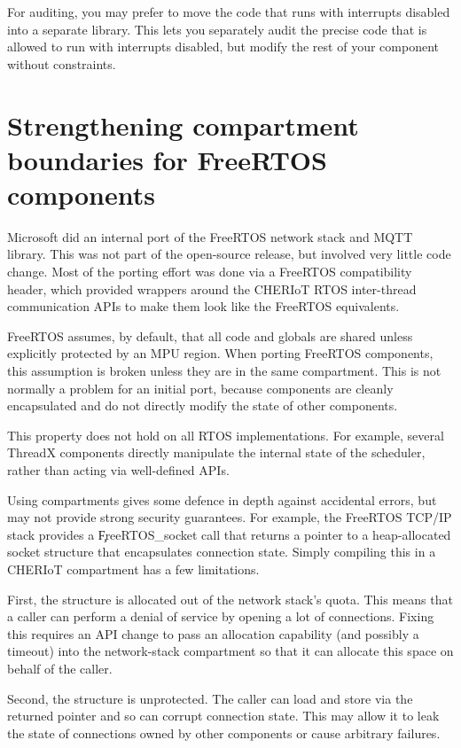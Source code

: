 For auditing, you may prefer to move the code that runs with interrupts disabled into a separate library.
This lets you separately audit the precise code that is allowed to run with interrupts disabled, but modify the rest of your component without constraints.

\section{Strengthening compartment boundaries for FreeRTOS components }

Microsoft did an internal port of the FreeRTOS network stack and MQTT library.
This was not part of the open-source release, but involved very little code change.
Most of the porting effort was done via a FreeRTOS compatibility header, which provided wrappers around the CHERIoT RTOS inter-thread communication APIs to make them look like the FreeRTOS equivalents.

FreeRTOS assumes, by default, that all code and globals are shared unless explicitly protected by an MPU region.
When porting FreeRTOS components, this assumption is broken unless they are in the same compartment.
This is not normally a problem for an initial port, because components are cleanly encapsulated and do not directly modify the state of other components.

\begin{note}
This property does not hold on all RTOS implementations.
For example, several ThreadX components directly manipulate the internal state of the scheduler, rather than acting via well-defined APIs.
\end{note}

Using compartments gives some defence in depth against accidental errors, but may not provide strong security guarantees.
For example, the FreeRTOS TCP/IP stack provides a \c{FreeRTOS_socket} call that returns a pointer to a heap-allocated socket structure that encapsulates connection state.
Simply compiling this in a CHERIoT compartment has a few limitations.

First, the structure is allocated out of the network stack's quota.
This means that a caller can perform a denial of service by opening a lot of connections.
Fixing this requires an API change to pass an allocation capability (and possibly a timeout) into the network-stack compartment so that it can allocate this space on behalf of the caller.

Second, the structure is unprotected.
The caller can load and store via the returned pointer and so can corrupt connection state.
This may allow it to leak the state of connections owned by other components or cause arbitrary failures.

